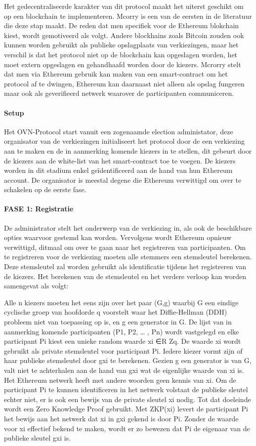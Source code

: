 			Het gedecentraliseerde karakter van dit protocol maakt het uiterst geschikt om op een blockchain te implementeren. Mcorry is een van de eersten in de literatuur die deze stap maakt. De reden dat men specifiek voor de Ethereum blokchain kiest, wordt gemotiveerd als volgt.
			Andere blockhains zoals Bitcoin zouden ook kunnen worden gebruikt als publieke opslagplaats van verkiezingen, maar het verschil is dat het protocol niet op de blockchain kan opgeslagen worden, het moet extern opgeslagen en gehandhaafd worden door de kiezers. Mcrorry stelt dat men via Ethereum gebruik kan maken van een smart-contract om  het protocol af te dwingen, Ethereum kan daarnaast niet alleen als opslag fungeren maar ook als geverifieerd netwerk waarover de participanten communiceren.
			\paragraph*{Setup }
			Het OVN-Protocol start vanuit een zogenaamde election administator, deze organisator van de verkiezingen initialiseert het protocol door de een verkiezing aan te maken en de in aanmerking komende kiezers in te stellen, dit gebeurt door de kiezers aan de white-list van het smart-contract toe te voegen. De kiezers worden in dit stadium enkel geïdentificeerd aan de hand van hun Ethereum account. De organisator is meestal degene die  Ethereum verwittigd om over te schakelen op de eerste fase.
			\paragraph*{FASE 1: Registratie }
			De administrator stelt het onderwerp van de verkiezing in, als ook de beschikbare opties waarvoor gestemd kan worden. Vervolgens wordt Ethereum opnieuw verwittigd, ditmaal om over te gaan naar het registreren van participanten. Om te registreren voor de verkiezing moeten alle stemmers een stemsleutel berekenen. Deze stemsleutel zal worden gebruikt als identificatie tijdens het registreren van de kiezers. Het berekenen  van de stemsleutel en het verdere verloop kan worden samengevat als volgt: 
			
			Alle n kiezers moeten het eens zijn over het paar (G,g) waarbij G een eindige cyclische groep van hoofdorde q voorstelt waar het Diffie-Hellman (DDH) probleem niet van toepassing op is, en g een generator in G. De lijst van in aanmerking komende participanten (P1, P2, … , Pn) wordt vastgelegd en elke participant Pi kiest een unieke random waarde xi ∈R Zq. De waarde xi wordt gebruikt als private stemsleutel voor participant Pi.  Iedere kiezer vormt zijn of haar publieke stemsleutel door gxi te berekenen. Gezien g een generator is van G, valt niet te achterhalen aan de hand van gxi wat de eigenlijke waarde van xi is. Het Ethereum netwerk heeft met andere woorden geen kennis van xi. Om de participant Pi te kunnen identificeren in het netwerk volstaat de publieke sleutel echter niet, er is ook een bewijs van de private sleutel xi nodig. Tot dat doeleinde wordt een Zero Knowledge Proof gebruikt. Met ZKP(xi) levert de participant Pi  het bewijs aan het netwerk dat xi  in gxi gekend is door Pi. Zonder de waarde voor xi effectief bekend te maken, wordt er zo bewezen dat Pi de eigenaar van de publieke sleutel gxi  is.
			
